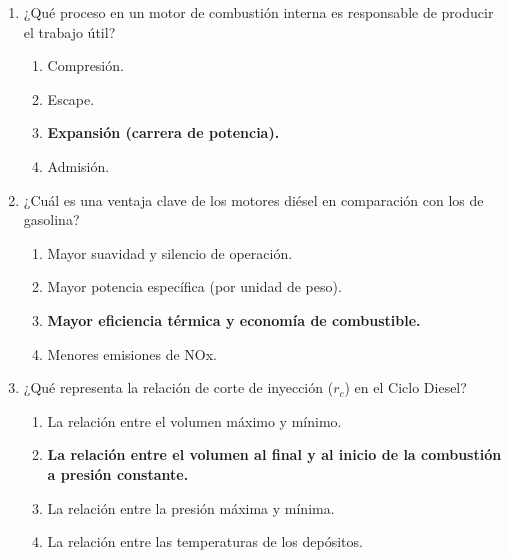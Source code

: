 \documentclass{article}
\begin{document}
\begin{enumerate}[label=\arabic*.]
    \item ¿Qué proceso en un motor de combustión interna es responsable de producir el trabajo útil?
    \begin{enumerate}[label=\alph*)]
        \item Compresión.
        \item Escape.
        \item \textbf{Expansión (carrera de potencia).}
        \item Admisión.
    \end{enumerate}

    \item ¿Cuál es una ventaja clave de los motores diésel en comparación con los de gasolina?
    \begin{enumerate}[label=\alph*)]
        \item Mayor suavidad y silencio de operación.
        \item Mayor potencia específica (por unidad de peso).
        \item \textbf{Mayor eficiencia térmica y economía de combustible.}
        \item Menores emisiones de NOx.
    \end{enumerate}

    \item ¿Qué representa la relación de corte de inyección ($r_c$) en el Ciclo Diesel?
    \begin{enumerate}[label=\alph*)]
        \item La relación entre el volumen máximo y mínimo.
        \item \textbf{La relación entre el volumen al final y al inicio de la combustión a presión constante.}
        \item La relación entre la presión máxima y mínima.
        \item La relación entre las temperaturas de los depósitos.
    \end{enumerate}

\end{enumerate}
\end{document}
